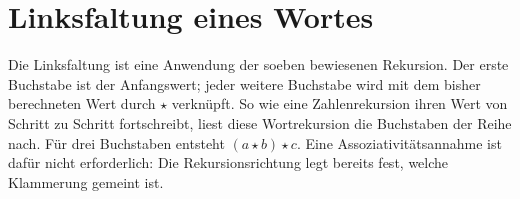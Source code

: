 \documentclass[main.tex]{subfiles}
\begin{document}
\section{Linksfaltung eines Wortes}

Die Linksfaltung ist eine Anwendung der soeben bewiesenen Rekursion.
Der erste Buchstabe ist der Anfangswert; jeder weitere Buchstabe wird
mit dem bisher berechneten Wert durch \(\star\) verknüpft. So wie
eine Zahlenrekursion ihren Wert von Schritt zu Schritt fortschreibt,
liest diese Wortrekursion die Buchstaben der Reihe nach. Für drei
Buchstaben entsteht \((a\star b)\star c\). Eine Assoziativitätsannahme
ist dafür nicht erforderlich: Die Rekursionsrichtung legt bereits fest,
welche Klammerung gemeint ist.

\end{document}
